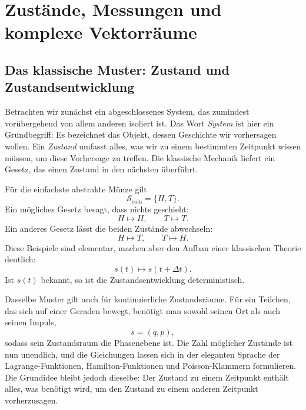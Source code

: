 \chapter{Zustände, Messungen und komplexe Vektorräume}


\section{Das klassische Muster: Zustand und Zustandsentwicklung}

Betrachten wir zunächst ein abgeschlossenes System, das zumindest vorübergehend von allem anderen isoliert ist. Das Wort \emph{System} ist hier ein Grundbegriff: Es bezeichnet das Objekt, dessen Geschichte wir vorhersagen wollen. Ein \emph{Zustand} umfasst alles, was wir zu einem bestimmten Zeitpunkt wissen müssen, um diese Vorhersage zu treffen. Die klassische Mechanik liefert ein Gesetz, das einen Zustand in den nächsten überführt.

Für die einfachste abstrakte Münze gilt
\begin{equation}
  \mathcal S_{\mathrm{coin}}=\{H,T\}.
\end{equation}
Ein mögliches Gesetz besagt, dass nichts geschieht:
\begin{equation}
  H\longmapsto H,
  \qquad
  T\longmapsto T.
\end{equation}
Ein anderes Gesetz lässt die beiden Zustände abwechseln:
\begin{equation}
  H\longmapsto T,
  \qquad
  T\longmapsto H.
\end{equation}
Diese Beispiele sind elementar, machen aber den Aufbau einer klassischen Theorie deutlich:
\begin{equation}
  s(t)\longmapsto s(t+\Delta t).
\end{equation}
Ist \(s(t)\) bekannt, so ist die Zustandsentwicklung deterministisch.

Dasselbe Muster gilt auch für kontinuierliche Zustandsräume. Für ein Teilchen, das sich auf einer Geraden bewegt, benötigt man sowohl seinen Ort als auch seinen Impuls,
\begin{equation}
  s=(q,p),
\end{equation}
sodass sein Zustandsraum die Phasenebene ist. Die Zahl möglicher Zustände ist nun unendlich, und die Gleichungen lassen sich in der eleganten Sprache der Lagrange-Funktionen, Hamilton-Funktionen und Poisson-Klammern formulieren. Die Grundidee bleibt jedoch dieselbe: Der Zustand zu einem Zeitpunkt enthält alles, was benötigt wird, um den Zustand zu einem anderen Zeitpunkt vorherzusagen.

